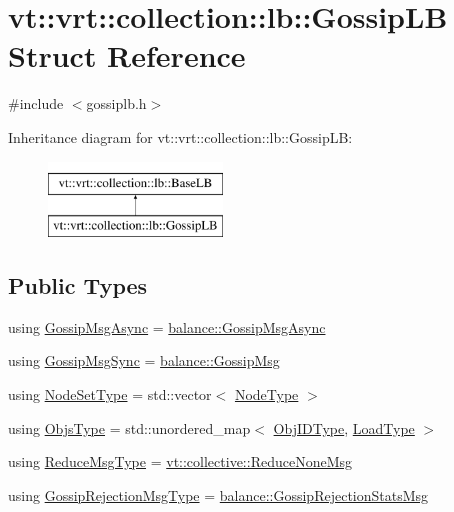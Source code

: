 \hypertarget{structvt_1_1vrt_1_1collection_1_1lb_1_1_gossip_l_b}{}\section{vt\+:\+:vrt\+:\+:collection\+:\+:lb\+:\+:Gossip\+LB Struct Reference}
\label{structvt_1_1vrt_1_1collection_1_1lb_1_1_gossip_l_b}


{\ttfamily \#include $<$gossiplb.\+h$>$}

Inheritance diagram for vt\+:\+:vrt\+:\+:collection\+:\+:lb\+:\+:Gossip\+LB\+:\begin{figure}[H]
\begin{center}
\leavevmode
\includegraphics[height=2.000000cm]{structvt_1_1vrt_1_1collection_1_1lb_1_1_gossip_l_b}
\end{center}
\end{figure}
\subsection*{Public Types}
\begin{DoxyCompactItemize}
\item 
using \hyperlink{structvt_1_1vrt_1_1collection_1_1lb_1_1_gossip_l_b_a6da4208feb7b153c54595d06f82d5e56}{Gossip\+Msg\+Async} = \hyperlink{structvt_1_1vrt_1_1collection_1_1balance_1_1_gossip_msg_async}{balance\+::\+Gossip\+Msg\+Async}
\item 
using \hyperlink{structvt_1_1vrt_1_1collection_1_1lb_1_1_gossip_l_b_a39aebe4c174695c551b5b9a907bac615}{Gossip\+Msg\+Sync} = \hyperlink{structvt_1_1vrt_1_1collection_1_1balance_1_1_gossip_msg}{balance\+::\+Gossip\+Msg}
\item 
using \hyperlink{structvt_1_1vrt_1_1collection_1_1lb_1_1_gossip_l_b_abb53f1d4bd3c37f3e68c3b5b0e1f1c86}{Node\+Set\+Type} = std\+::vector$<$ \hyperlink{namespacevt_a866da9d0efc19c0a1ce79e9e492f47e2}{Node\+Type} $>$
\item 
using \hyperlink{structvt_1_1vrt_1_1collection_1_1lb_1_1_gossip_l_b_ad2093cf08cc6af0f3deb4441e40c55a9}{Objs\+Type} = std\+::unordered\+\_\+map$<$ \hyperlink{structvt_1_1vrt_1_1collection_1_1lb_1_1_base_l_b_a790b22acf448880599724749cdc4e9b3}{Obj\+I\+D\+Type}, \hyperlink{structvt_1_1vrt_1_1collection_1_1lb_1_1_base_l_b_a215e22b9f12678303f49615ae3be05cc}{Load\+Type} $>$
\item 
using \hyperlink{structvt_1_1vrt_1_1collection_1_1lb_1_1_gossip_l_b_ad251f887a319f433771b084187ef6089}{Reduce\+Msg\+Type} = \hyperlink{namespacevt_1_1collective_aa439a90f05078f2bcf918641c951946f}{vt\+::collective\+::\+Reduce\+None\+Msg}
\item 
using \hyperlink{structvt_1_1vrt_1_1collection_1_1lb_1_1_gossip_l_b_aca0c34945e33ca19b88af98ca8a6f062}{Gossip\+Rejection\+Msg\+Type} = \hyperlink{structvt_1_1vrt_1_1collection_1_1balance_1_1_gossip_rejection_stats_msg}{balance\+::\+Gossip\+Rejection\+Stats\+Msg}
\end{DoxyCompactItemize}
